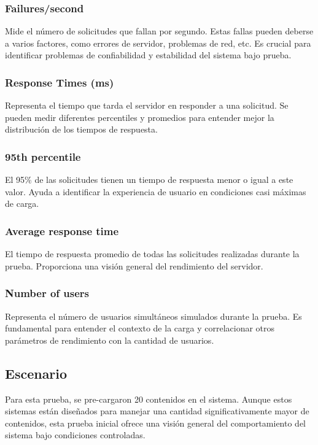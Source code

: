 \documentclass[10pt,times,twocolumn]{article}
\begin{document}
\subsubsection{Failures/second}

Mide el número de solicitudes que fallan por segundo. Estas fallas pueden deberse a varios factores, como errores de servidor, problemas de red, etc. Es crucial para identificar problemas de confiabilidad y estabilidad del sistema bajo prueba.

\subsubsection{Response Times (ms)}

Representa el tiempo que tarda el servidor en responder a una solicitud. Se pueden medir diferentes percentiles y promedios para entender mejor la distribución de los tiempos de respuesta.

\subsubsection{95th percentile}

El 95\% de las solicitudes tienen un tiempo de respuesta menor o igual a este valor.
Ayuda a identificar la experiencia de usuario en condiciones casi máximas de carga.

\subsubsection{Average response time}

El tiempo de respuesta promedio de todas las solicitudes realizadas durante la prueba. Proporciona una visión general del rendimiento del servidor.

\subsubsection{Number of users}

Representa el número de usuarios simultáneos simulados durante la prueba. Es fundamental para entender el contexto de la carga y correlacionar otros parámetros de rendimiento con la cantidad de usuarios.

\subsection{Escenario}

Para esta prueba, se pre-cargaron 20 contenidos en el sistema. Aunque estos sistemas están diseñados para manejar una cantidad significativamente mayor de contenidos, esta prueba inicial ofrece una visión general del comportamiento del sistema bajo condiciones controladas.
\end{document}
